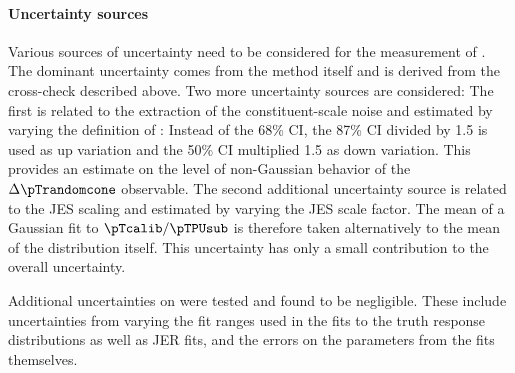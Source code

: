 \paragraph{Uncertainty sources} Various sources of uncertainty need to be considered for the measurement of \Npileup. The dominant uncertainty comes from the method itself and is derived from the cross-check described above. Two more uncertainty sources are considered:
The first is related to the extraction of the constituent-scale noise and estimated by varying the definition of \sigmaRC: Instead of the 68\% CI, the 87\% CI divided by 1.5 is used as up variation and the 50\% CI multiplied 1.5 as down variation. This provides an estimate on the level of non-Gaussian behavior of the $\Delta \pTrandomcone$ observable. The second additional uncertainty source is related to the JES scaling and estimated by varying the JES scale factor. The mean of a Gaussian fit to $\pTcalib / \pTPUsub$ is therefore taken alternatively to the mean of the distribution itself. This uncertainty has only a small contribution to the overall uncertainty.

Additional uncertainties on \Npileup were tested and found to be negligible. These include uncertainties from varying the fit ranges used in the fits to the truth response distributions as well as JER fits, and the errors on the parameters from the fits themselves.



